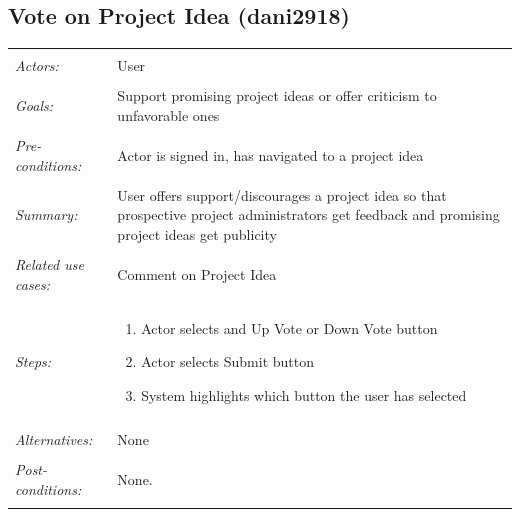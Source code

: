 \documentclass[11pt]{report}
\begin{document}
\subsection{Vote on Project Idea (dani2918)}
\begin{tabular}{ p{2cm} p{12cm} }
 \hline
 \\
 \textit{Actors:} & User \\ 
 \\
 \textit{Goals:} & Support promising project ideas or offer criticism to unfavorable ones  \\
 \\
 \textit{Pre-conditions:} & Actor is signed in, has navigated to a project idea  \\
 \\
 \textit{Summary:} &  User offers support/discourages a project idea so that prospective project administrators get feedback and promising project ideas get publicity \\ 
 \\
 \textit{Related use cases:} & Comment on Project Idea \\ 
 \\
 \textit{Steps:} & \begin{enumerate}
  \item Actor selects and Up Vote or Down Vote button
  \item Actor selects Submit button 
  \item System highlights which button the user has selected
 \end{enumerate} \\
 \\
 \textit{Alternatives:} & None \\
 \\
 \textit{Post-conditions:} & None. \\
 \\
\hline
\end{tabular}
\end{document}
